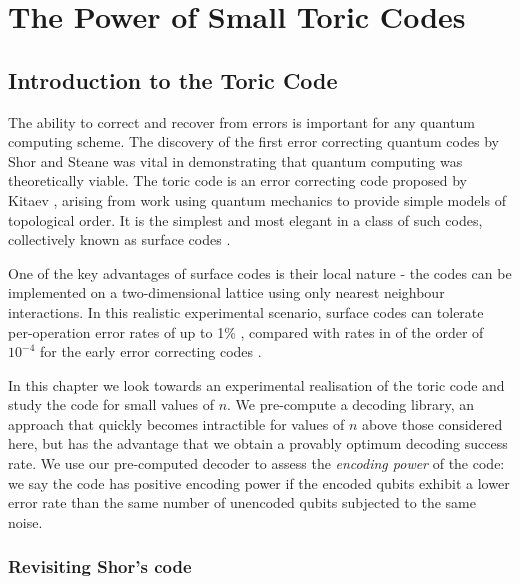 \chapter{The Power of Small Toric Codes} 
\label{ch:SurfaceCodes}

\section{Introduction to the Toric Code}

The ability to correct and recover from errors is important for any quantum computing scheme. The discovery of the first error correcting quantum codes by Shor and Steane was vital in demonstrating that quantum computing was theoretically viable. The toric code is an error correcting code proposed by Kitaev \cite{kitaev_1, kitaev_2}, arising from work using quantum mechanics to provide simple models of topological order. It is the simplest and most elegant in a class of such codes, collectively known as surface codes \cite{kitaev_bravyi, planar_codes_freedman_meyer}.

One of the key advantages of surface codes is their local nature - the codes can be implemented on a two-dimensional lattice using only nearest neighbour interactions. In this realistic experimental scenario, surface codes can tolerate per-operation error rates of up to 1\% \cite{fowler_11, fowler_classical_processing}, compared with rates in of the order of $10^{-4}$ for the early error correcting codes \cite{steane_code_shit}.

In this chapter we look towards an experimental realisation of the toric code and study the code for small values of $n$. We pre-compute a decoding library, an approach that quickly becomes intractible for values of $n$ above those considered here, but has the advantage that we obtain a provably optimum decoding success rate. We use our pre-computed decoder to assess the \textit{encoding power} of the code: we say the code has positive encoding power if the encoded qubits exhibit a lower error rate than the same number of unencoded qubits subjected to the same noise.

\subsection{Revisiting Shor's code}

